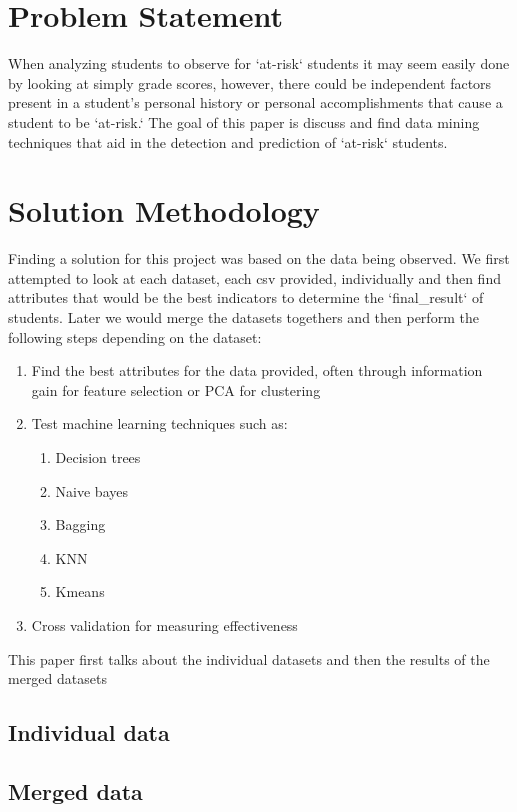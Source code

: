 \documentclass[12pt]{article}
\begin{document}
\section{Problem Statement}

When analyzing students to observe for `at-risk` students it may seem easily done by looking at simply grade scores, however, there could be independent factors
present in a student's personal history or personal accomplishments that cause a student to be `at-risk.` The goal of this paper is discuss and find data mining techniques that aid
in the detection and prediction of `at-risk` students.

\section{Solution Methodology}

Finding a solution for this project was based on the data being observed. We first attempted to look at each dataset, each csv provided, individually and then find attributes that would be the best indicators to determine the `final\_result` of students. Later we would merge the datasets togethers and then perform the following steps depending on the dataset:

\begin{enumerate}
  \item Find the best attributes for the data provided, often through information gain for feature selection or PCA for clustering
  \item Test machine learning techniques such as:
  \begin{enumerate}
     \item Decision trees
     \item Naive bayes
     \item Bagging
     \item KNN
     \item Kmeans
  \end{enumerate}
  \item Cross validation for measuring effectiveness
\end{enumerate}

This paper first talks about the individual datasets and then the results of the merged datasets

\subsection{Individual data}

\subsection{Merged data}
\end{document}
